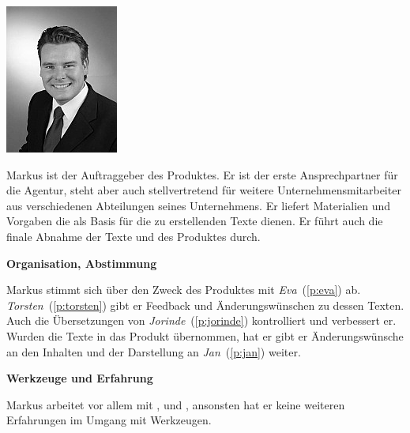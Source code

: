 \begin{multicols}{2}

\begin{center}
\includegraphics[width=0.5\columnwidth]{media/markus.jpg}
\end{center}


Markus ist der Auftraggeber des Produktes. Er ist der erste Ansprechpartner für die Agentur, steht aber auch stellvertretend für weitere Unternehmensmitarbeiter aus verschiedenen Abteilungen seines Unternehmens. Er liefert Materialien und Vorgaben die als Basis für die zu erstellenden Texte dienen. Er führt auch die finale Abnahme der Texte und des Produktes durch.

\textbf{Organisation, Abstimmung}

Markus stimmt sich über den Zweck des Produktes mit \emph{Eva}~(\ref{p:eva}) ab. \emph{Torsten}~(\ref{p:torsten}) gibt er Feedback und Änderungswünschen zu dessen Texten. Auch die Übersetzungen von \emph{Jorinde}~(\ref{p:jorinde}) kontrolliert und verbessert er. Wurden die Texte in das Produkt übernommen, hat er gibt er Änderungswünsche an den Inhalten und der Darstellung an \emph{Jan}~(\ref{p:jan}) weiter.

\textbf{Werkzeuge und Erfahrung}

Markus arbeitet vor allem mit ,  und , ansonsten hat er keine weiteren Erfahrungen im Umgang mit Werkzeugen.

\columnbreak


\end{multicols}
